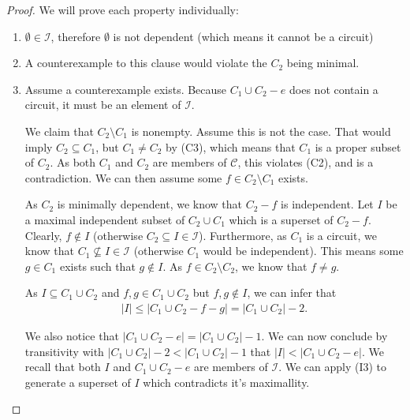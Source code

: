\begin{proof} We will prove each property individually:
  
\begin{enumerate}
    \item $\emptyset \in \mathcal I$, therefore $\emptyset$ is not dependent (which means it cannot be a circuit)
    \item A counterexample to this clause would violate the $C _2$ being minimal.
    \item Assume a counterexample exists. Because $C _1 \cup C _2 - e$ does not contain a circuit, it must be an element of $\mathcal I$. 

        We claim that $C _2 \setminus C _1$ is nonempty. Assume this is not the case. That would imply $C _2 \subseteq C _1$, but $C _1 \neq C _2 $ by (C3), which means that $C _1 $ is a proper subset of $C _2$. As both $C _1 $ and $C _2 $ are members of $\mathcal C$, this violates (C2), and is a contradiction. We can then assume some $f \in C _2 \setminus C _1 $ exists.

        As $C _2$ is minimally dependent, we know that $C _2 - f$ is independent. Let $I$ be a maximal independent subset of $C _2 \cup C _1$ which is a superset of $C _2 - f$. Clearly, $f \not\in I$ (otherwise $C _2 \subseteq I \in \mathcal I$). Furthermore, as $C _1 $ is a circuit, we know that $C _1 \not \subseteq I \in \mathcal I$ (otherwise $C _1$ would be independent). This means some $g \in C _1$ exists such that $g \not\in I$. As $f \in C _2  \setminus  C _2$, we know that $f \neq g$.

        As $I \subseteq C _1 \cup C _2$ and $f, g \in C _1 \cup C _2$ but $f, g \not\in I$, we can infer that 
        \begin{align*}
        |I| \leq |C _1 \cup C _2 - f - g| = |C _1 \cup C _2| - 2.
        \end{align*}

        We also notice that $|C _1 \cup C _2 - e| = |C _1 \cup C _2 | - 1$. We can now conclude by transitivity with $|C _1 \cup C _2 | - 2 < |C _1 \cup C _2 | - 1$ that $|I| < |C _1 \cup C _2 - e|$. We recall that both $I$ and $C _1 \cup C _2 - e$ are members of $\mathcal I$. We can apply (I3) to generate a superset of $I$ which contradicts it's maximallity.
\end{enumerate}
\end{proof}

